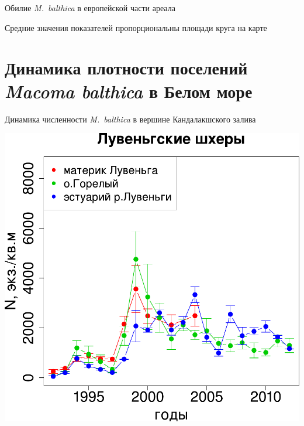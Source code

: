 \documentclass{beamer}
\begin{document}
\begin{frame}{Обилие {\it M.~balthica} в европейской части ареала}
\begin{minipage}[t]{.49\linewidth}
\begin{center}
		\end{center}
	\end{minipage}

{\tiny Средние значения показателей пропорциональны площади круга на карте}
\end{frame}



		\section[Динамика численности]{Динамика плотности поселений {\it Macoma balthica} в Белом море}
\begin{frame}{Динамика численности {\it M.~balthica} в вершине Кандалакшского залива}
	\begin{minipage}[t]{.49\linewidth}
		\begin{center}
			\includegraphics[width=\textwidth]{N2_dynamic_Luvenga_big1.pdf}
		\end{center}
	\end{minipage}
%
	\begin{minipage}[t]{.49\linewidth}
		\begin{center}

\end{center}
\end{minipage}
\end{frame}
\end{document}
